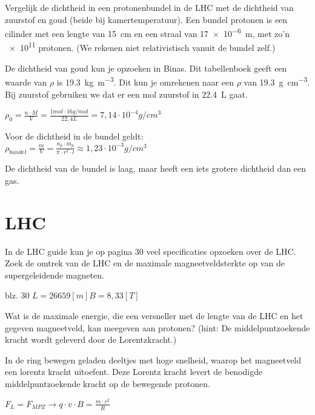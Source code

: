\begin{questions}
\question
Vergelijk de dichtheid in een protonenbundel in de LHC met de dichtheid van zuurstof en goud 
(beide bij kamertemperatuur). Een bundel protonen is een cilinder met een lengte 
van \SI{15}{\centi\meter} en een straal van \SI{17e-6}{m}, met zo'n \SI{e11}{} protonen.
(We rekenen niet relativistisch vanuit de bundel zelf.)
 
\begin{solution}

De dichtheid van goud kun je opzoeken in Binas. Dit tabellenboek geeft een waarde van 
$\rho$ is \SI{19.3}{\kilogram\per\cubic\meter}. Dit kun je omrekenen naar
een $\rho$ van \SI{19.3}{\gram\per\cubic\centi\meter}. 
Bij zuurstof gebruiken we dat er een mol zuurstof in \SI{22.4}{\liter} gaat.

$\rho_0 = \frac{n \cdot M}{V} = \frac {1 mol \cdot 16 g/mol}{22,4 L} = 7,14 \cdot 10^{-4} g/cm^{3} $

Voor de dichtheid in de bundel geldt:\\
$\rho_{bundel} = \frac{m}{V} = \frac{n_{p} \cdot m_{p}}{\pi \cdot r^2 \cdot l} \approx 1,23 \cdot 10^{-3} g/cm^{3}$

De dichtheid van de bundel is laag, maar heeft een iets grotere dichtheid dan een
gas.
\end{solution}

\section{LHC}

In de LHC guide kun je op pagina 30 veel specificaties opzoeken over de LHC.
\question
Zoek de omtrek van de LHC en de maximale magneetveldsterkte op van de 
supergeleidende magneten.
\begin{solution}
blz. 30 $L = 26 659 [m] B = 8,33 [T]$
\end{solution}

\question 
Wat is de maximale energie, die een versneller met de lengte van de LHC en
het gegeven magneetveld, kan meegeven aan protonen? (hint: De middelpuntzoekende kracht wordt geleverd door
de Lorentzkracht.)

\begin{solution}
In de ring bewegen geladen deeltjes met hoge snelheid, waarop het magneetveld
een lorentz kracht uitoefent. Deze Lorentz kracht levert de benodigde middelpuntzoekende
kracht op de bewegende protonen.

$F_L = F_{MPZ} \rightarrow q \cdot v \cdot B = \frac{m \cdot v^2}{R}$


\end{solution}
\end{questions}
